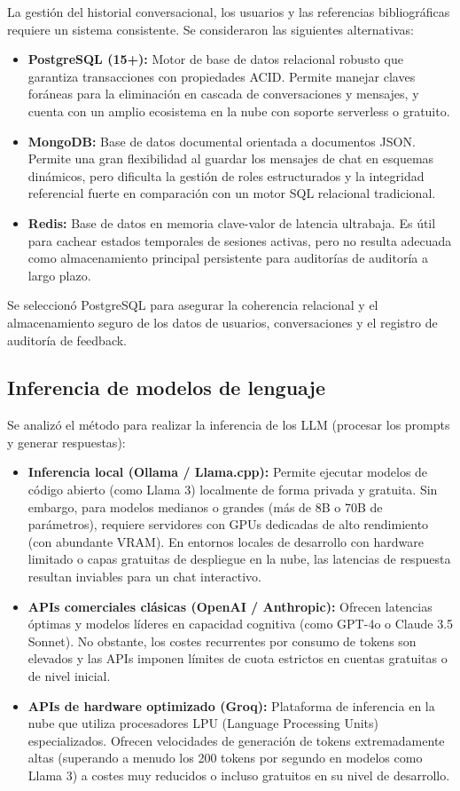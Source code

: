 \documentclass[12pt,a4paper,oneside]{report}
\begin{document}
La gestión del historial conversacional, los usuarios y las referencias bibliográficas requiere un sistema consistente. Se consideraron las siguientes alternativas:
\begin{itemize}
    \item \textbf{PostgreSQL (15+):} Motor de base de datos relacional robusto que garantiza transacciones con propiedades ACID. Permite manejar claves foráneas para la eliminación en cascada de conversaciones y mensajes, y cuenta con un amplio ecosistema en la nube con soporte serverless o gratuito.
    \item \textbf{MongoDB:} Base de datos documental orientada a documentos JSON. Permite una gran flexibilidad al guardar los mensajes de chat en esquemas dinámicos, pero dificulta la gestión de roles estructurados y la integridad referencial fuerte en comparación con un motor SQL relacional tradicional.
    \item \textbf{Redis:} Base de datos en memoria clave-valor de latencia ultrabaja. Es útil para cachear estados temporales de sesiones activas, pero no resulta adecuada como almacenamiento principal persistente para auditorías de auditoría a largo plazo.
\end{itemize}

Se seleccionó PostgreSQL para asegurar la coherencia relacional y el almacenamiento seguro de los datos de usuarios, conversaciones y el registro de auditoría de feedback.

\subsection*{Inferencia de modelos de lenguaje}

Se analizó el método para realizar la inferencia de los LLM (procesar los prompts y generar respuestas):
\begin{itemize}
    \item \textbf{Inferencia local (Ollama / Llama.cpp):} Permite ejecutar modelos de código abierto (como Llama 3) localmente de forma privada y gratuita. Sin embargo, para modelos medianos o grandes (más de 8B o 70B de parámetros), requiere servidores con GPUs dedicadas de alto rendimiento (con abundante VRAM). En entornos locales de desarrollo con hardware limitado o capas gratuitas de despliegue en la nube, las latencias de respuesta resultan inviables para un chat interactivo.
    \item \textbf{APIs comerciales clásicas (OpenAI / Anthropic):} Ofrecen latencias óptimas y modelos líderes en capacidad cognitiva (como GPT-4o o Claude 3.5 Sonnet). No obstante, los costes recurrentes por consumo de tokens son elevados y las APIs imponen límites de cuota estrictos en cuentas gratuitas o de nivel inicial.
    \item \textbf{APIs de hardware optimizado (Groq):} Plataforma de inferencia en la nube que utiliza procesadores LPU (Language Processing Units) especializados. Ofrecen velocidades de generación de tokens extremadamente altas (superando a menudo los 200 tokens por segundo en modelos como Llama 3) a costes muy reducidos o incluso gratuitos en su nivel de desarrollo.
\end{itemize}
\end{document}
